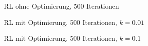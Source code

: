 \documentclass[a4paper,12pt]{article}
\begin{document}
\begin{figure}[h]
\caption{RL ohne Optimierung, 500 Iterationen}%
\label{figure_konv_ohne}
\end{figure}

\begin{figure}[h]
\caption{RL mit Optimierung, 500 Iterationen, $k = 0.01$}%
\label{figure_konv_k0_01}
\end{figure}


\begin{figure}[h]
\caption{RL mit Optimierung, 500 Iterationen, $k = 0.1$}%
\label{figure_konv_k0_1}
\end{figure}
\end{document}
